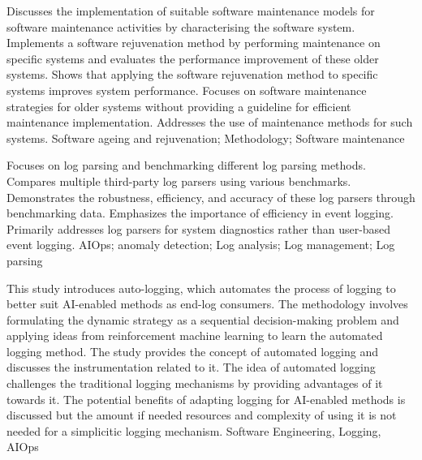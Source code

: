 {
    Discusses the implementation of suitable software maintenance models for software maintenance activities by characterising the software system.
}
{
    Implements a software rejuvenation method by performing maintenance on specific systems and evaluates the performance improvement of these older systems.
}
{
    Shows that applying the software rejuvenation method to specific systems improves system performance.
}
{
    Focuses on software maintenance strategies for older systems without providing a guideline for efficient maintenance implementation. Addresses the use of maintenance methods for such systems.
}
{
    Software ageing and rejuvenation; Methodology; Software maintenance
}

{
    Focuses on log parsing and benchmarking different log parsing methods.
}
{
    Compares multiple third-party log parsers using various benchmarks.
}
{
    Demonstrates the robustness, efficiency, and accuracy of these log parsers through benchmarking data.
}
{
    Emphasizes the importance of efficiency in event logging. Primarily addresses log parsers for system diagnostics rather than user-based event logging.
}
{
    AIOps; anomaly detection; Log analysis; Log management; Log parsing
}

{
    This study introduces auto-logging, which automates the process of logging to better suit AI-enabled methods as end-log consumers.
}
{
    The methodology involves formulating the dynamic strategy as a sequential decision-making problem and applying ideas from reinforcement machine learning to learn the automated logging method.
}
{
    The study provides the concept of automated logging and discusses the instrumentation related to it.
}
{
    The idea of automated logging challenges the traditional logging mechanisms by providing advantages of it towards it. The potential benefits of adapting logging for AI-enabled methods is discussed but the amount if needed resources and complexity of using it is not needed for a simplicitic logging mechanism.
}
{
    Software Engineering, Logging, AIOps
}

